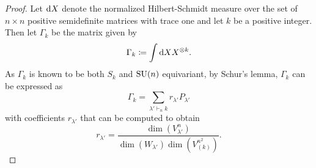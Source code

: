 \documentclass[notitlepage, 10pt]{article}
\begin{document}
\begin{proof}
    Let $\mathrm{d} X$ denote the normalized Hilbert-Schmidt measure over the set of $n\times n$ positive semidefinite matrices with trace one and let $k$ be a positive integer.
    Then let $\Gamma_{k}$ be the matrix given by 
    \begin{equation}
        \Gamma_{k} \coloneqq \int \mathrm{d} X X^{\otimes k}.
    \end{equation}
    As $\Gamma_{k}$ is known to be both $S_k$ and $\operatorname{SU}(n)$ equivariant, by Schur's lemma, $\Gamma_{k}$ can be expressed as 
    \begin{equation}
        \Gamma_{k} = \sum_{\lambda' \vdash_n k} r_{\lambda'} P_{\lambda'}
    \end{equation}
    with coefficients $r_{\lambda'}$ that can be computed \cite{zyczkowski2001induced,walter2014multipartite} to obtain
    \begin{equation}
        r_{\lambda'} = \frac{\dim(V_{\lambda'}^{n})}{\dim(W_{\lambda'})\dim(V_{(k)}^{n^2})}.
    \end{equation}


\end{proof}
\end{document}
